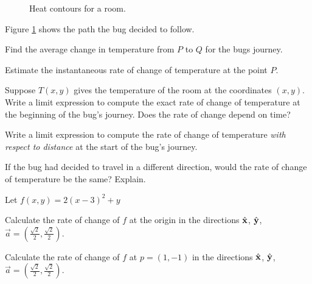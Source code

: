 \begin{figure}[h!]
\begin{center}
	\end{center}
	\vspace{-.5cm}
	\caption{Heat contours for a room.}
	\label{heatcontour2}
\end{figure}

\begin{question} 
	Figure \ref{heatcontour2} shows the path the bug decided to follow.
	\begin{parts}
		\item Find the average change in temperature from $P$ to $Q$ for the bugs journey.
		\item Estimate the instantaneous rate of change of temperature at the point $P$.
		\item Suppose $T(x,y)$ gives the temperature of the room at the coordinates $(x,y)$.
			Write a limit expression to compute the exact rate of change of temperature
			at the beginning of the bug's journey. Does the rate of change depend on time?
		\item Write a limit expression to compute the rate of change of temperature
			\emph{with respect to distance} at the start of the bug's journey.
		\item If the bug had decided to travel in a different direction, would the rate of change
			of temperature be the same?  Explain.
	\end{parts}
\end{question}

\begin{question}
	Let $f(x,y) = 2(x-3)^2+y$
	\begin{parts}
		\item Calculate the rate of change of $f$ at the origin 
			in the directions ${\hat {\mathbf x}}$, ${\hat {\mathbf y}}$, $\vec a=(\tfrac{\sqrt{2}}{2},\tfrac{\sqrt{2}}{2})$.
		\item Calculate the rate of change of $f$ at $p=(1,-1)$
			in the directions ${\hat {\mathbf x}}$, ${\hat {\mathbf y}}$, $\vec a=(\tfrac{\sqrt{2}}{2},\tfrac{\sqrt{2}}{2})$.
	\end{parts}
\end{question}


